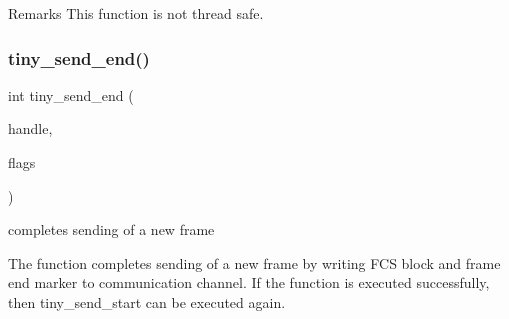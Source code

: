 \begin{DoxyRemark}{Remarks}
This function is not thread safe. 
\end{DoxyRemark}
\mbox{\label{group__ADVANCED__API_ga2e85c7e9efb0bbe9c6adfd923ec7c73c}} 
\subsubsection{\texorpdfstring{tiny\+\_\+send\+\_\+end()}{tiny\_send\_end()}}
{\footnotesize\ttfamily int tiny\+\_\+send\+\_\+end (\begin{DoxyParamCaption}\item[{\hyperlink{structSTinyData}{S\+Tiny\+Data} $\ast$}]{handle,  }\item[{uint8\+\_\+t}]{flags }\end{DoxyParamCaption})}



completes sending of a new frame 

The function completes sending of a new frame by writing F\+CS block and frame end marker to communication channel. If the function is executed successfully, then tiny\+\_\+send\+\_\+start can be executed again.


